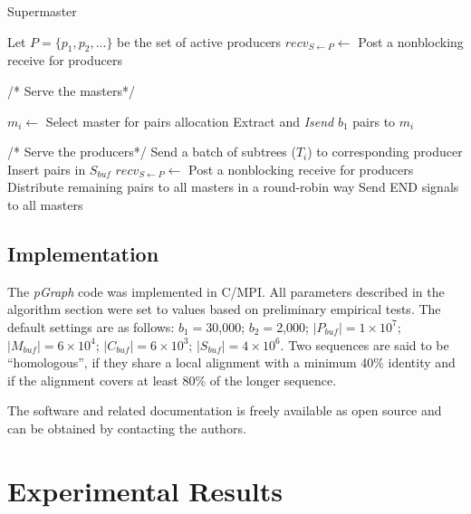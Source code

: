 \documentclass[10pt,journal,letterpaper,compsoc]{IEEEtran}
\begin{document}
\begin{algorithm}
\caption{Supermaster}
\label{sp}
\begin{algorithmic}[1]
	\STATE Let $P=\{p_1, p_2, ...\}$ be the set of active producers
	\STATE $recv_{S\leftarrow P}\leftarrow$ Post a nonblocking receive for producers
			
	    
	    \STATE /* Serve the masters*/        
	    	
	    	\STATE $m_i\leftarrow$ Select master for pairs allocation
		    \STATE Extract and {\it Isend} $b_1$ pairs to $m_i$ 
		    	
		    \ENDIF
		    \STATE /* Serve the producers*/        
		             \STATE Send a batch of subtrees ($T_i$) to corresponding producer
			        \STATE Insert pairs in $S_{buf}$
		        \ENDIF
		        \STATE $recv_{S\leftarrow P}\leftarrow$ Post a nonblocking receive for producers
		    \ENDIF    
    \ENDWHILE
	\STATE Distribute remaining pairs to all masters in a round-robin way
	\STATE Send END signals to all  masters
\end{algorithmic}
\end{algorithm}


\subsection{Implementation}
The {\it pGraph} code was implemented in C/MPI. All parameters described in the algorithm section were set to values based on preliminary empirical tests.  The default settings are as follows: $b_1=$30,000; $b_2=$2,000; $|P_{buf}|=1\times 10^7$; $|M_{buf}|=6\times 10^4$; $|C_{buf}|=6\times 10^3$; $|S_{buf}|=4\times 10^6$. 
Two sequences are said to be ``homologous'', if they share a local alignment with a minimum 40\% identity and if the alignment covers at least 80\% of the longer sequence. 

The software and related documentation is freely available as open source and can be obtained by contacting the authors.

\section{Experimental Results}
\label{secResults}
\end{document}
